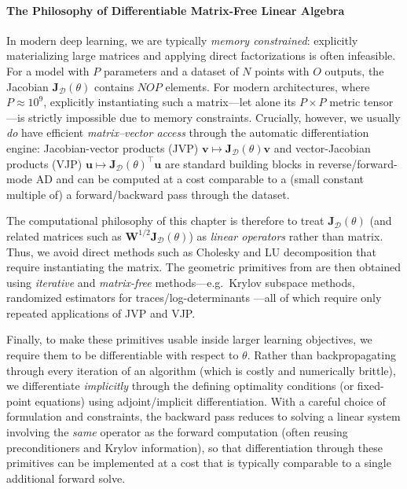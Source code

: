 \paragraph{The Philosophy of Differentiable Matrix-Free Linear Algebra}
In modern deep learning, we are typically \emph{memory constrained}: explicitly materializing large matrices and applying direct factorizations is often infeasible. For a model with $P$ parameters and a dataset of $N$ points with $O$ outputs, the Jacobian $\mathbf{J}_\mathcal{D}(\theta)$ contains $NOP$ elements. For modern architectures, where $P \approx 10^9$, explicitly instantiating such a matrix—let alone its $P \times P$ metric tensor—is strictly impossible due to memory constraints.
Crucially, however, we usually \emph{do} have efficient \emph{matrix--vector access} through the automatic differentiation engine: Jacobian-vector products (\textsf{JVP}) $\mathbf{v} \mapsto \mathbf{J}_{\mathcal D}(\theta)\mathbf{v}$ and vector-Jacobian products (\textsf{VJP}) $\mathbf{u} \mapsto \mathbf{J}_{\mathcal D}(\theta)^\top \mathbf{u}$ are standard building blocks in reverse/forward-mode AD and can be computed at a cost comparable to a (small constant multiple of) a forward/backward pass through the dataset.

The computational philosophy of this chapter is therefore to treat $\mathbf{J}_{\mathcal D}(\theta)$ (and related matrices such as $\mathbf{W}^{1/2}\mathbf{J}_{\mathcal D}(\theta)$) as \emph{linear operators} rather than matrix. Thus, we avoid direct methods such as Cholesky and LU decomposition that require instantiating the matrix. The geometric primitives from  are then obtained using \emph{iterative} and \emph{matrix-free} methods---e.g.\ Krylov subspace methods, randomized estimators for traces/log-determinants ---all of which require only repeated applications of \textsf{JVP} and \textsf{VJP}. 

Finally, to make these primitives usable inside larger learning objectives, we require them to be differentiable with respect to $\theta$. Rather than backpropagating through every iteration of an algorithm (which is costly and numerically brittle), we differentiate \emph{implicitly} through the defining optimality conditions (or fixed-point equations) using adjoint/implicit differentiation. With a careful choice of formulation and constraints, the backward pass reduces to solving a linear system involving the \emph{same} operator as the forward computation (often reusing preconditioners and Krylov information), so that differentiation through these primitives can be implemented at a cost that is typically comparable to a single additional forward solve.


